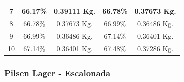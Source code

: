\begin{minipage}{0.95\textwidth}
\begin{tabularx}{\textwidth}{|X|X|X|X|X|}
             \hline
             \multicolumn{1}{|c|}{7} & \multicolumn{1}{c|}{66.17\%}  & \multicolumn{1}{c|}{0.39111 Kg.} &\multicolumn{1}{c|}{66.78\%} &\multicolumn{1}{c|}{0.37673 Kg.} \\
             \hline
             \multicolumn{1}{|c|}{8} & \multicolumn{1}{c|}{66.78\%}  & \multicolumn{1}{c|}{0.37673 Kg.} &\multicolumn{1}{c|}{66.99\%} &\multicolumn{1}{c|}{0.36486 Kg.} \\
             \hline
             \multicolumn{1}{|c|}{9} & \multicolumn{1}{c|}{66.99\%}  & \multicolumn{1}{c|}{0.36486 Kg.} &\multicolumn{1}{c|}{67.14\%} &\multicolumn{1}{c|}{0.36401 Kg.} \\
             \hline
             \multicolumn{1}{|c|}{10} & \multicolumn{1}{c|}{67.14\%} & \multicolumn{1}{c|}{0.36401 Kg.} &\multicolumn{1}{c|}{67.48\%} &\multicolumn{1}{c|}{0.37286 Kg.} \\
             \hline
        \end{tabularx}
        \label{tab:ResultadosPilsenSimple}
    \end{minipage}
    
 \subsubsection{Pilsen Lager - Escalonada}
    
